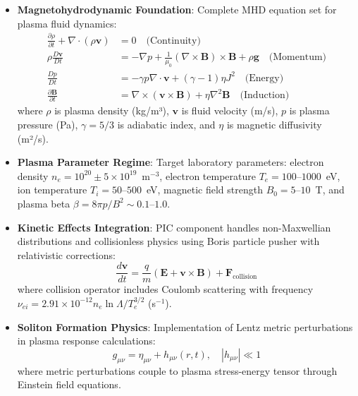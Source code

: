 \documentclass[12pt,a4paper]{article}
\begin{document}
\begin{itemize}
\item \textbf{Magnetohydrodynamic Foundation}: Complete MHD equation set for plasma fluid dynamics:
\begin{align}
\frac{\partial \rho}{\partial t} + \nabla \cdot (\rho \mathbf{v}) &= 0 \quad \text{(Continuity)} \\
\rho \frac{D\mathbf{v}}{Dt} &= -\nabla p + \frac{1}{\mu_0}(\nabla \times \mathbf{B}) \times \mathbf{B} + \rho \mathbf{g} \quad \text{(Momentum)} \\
\frac{Dp}{Dt} &= -\gamma p \nabla \cdot \mathbf{v} + (\gamma - 1) \eta J^2 \quad \text{(Energy)} \\
\frac{\partial \mathbf{B}}{\partial t} &= \nabla \times (\mathbf{v} \times \mathbf{B}) + \eta \nabla^2 \mathbf{B} \quad \text{(Induction)}
\end{align}
where $\rho$ is plasma density (kg/m³), $\mathbf{v}$ is fluid velocity (m/s), $p$ is plasma pressure (Pa), $\gamma = 5/3$ is adiabatic index, and $\eta$ is magnetic diffusivity (m²/s).

\item \textbf{Plasma Parameter Regime}: Target laboratory parameters: electron density $n_e = 10^{20} \pm 5 \times 10^{19}$~m$^{-3}$, electron temperature $T_e = 100$--$1000$~eV, ion temperature $T_i = 50$--$500$~eV, magnetic field strength $B_0 = 5$--$10$~T, and plasma beta $\beta = 8\pi p / B^2 \sim 0.1$--$1.0$.

\item \textbf{Kinetic Effects Integration}: PIC component handles non-Maxwellian distributions and collisionless physics using Boris particle pusher with relativistic corrections:
\begin{equation}
\frac{d\mathbf{v}}{dt} = \frac{q}{m}\left(\mathbf{E} + \mathbf{v} \times \mathbf{B}\right) + \mathbf{F}_{\text{collision}}
\end{equation}
where collision operator includes Coulomb scattering with frequency $\nu_{ei} = 2.91 \times 10^{-12} n_e \ln\Lambda / T_e^{3/2}$ (s$^{-1}$).

\item \textbf{Soliton Formation Physics}: Implementation of Lentz metric perturbations in plasma response calculations:
\begin{equation}
g_{\mu\nu} = \eta_{\mu\nu} + h_{\mu\nu}(r,t), \quad |h_{\mu\nu}| \ll 1
\end{equation}
where metric perturbations couple to plasma stress-energy tensor through Einstein field equations.


\end{itemize}
\end{document}
